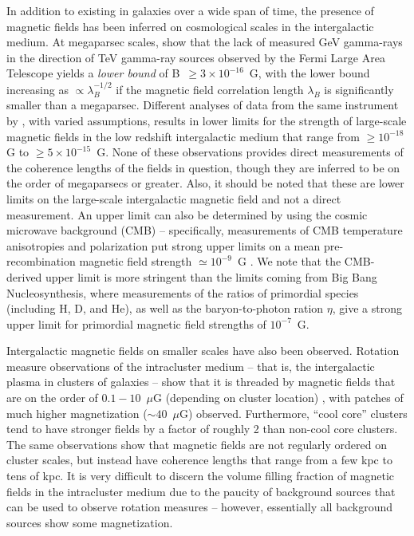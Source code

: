
In addition to existing in galaxies over a wide span of time, the
presence of magnetic fields has been inferred on cosmological scales
in the intergalactic medium.  At megaparsec scales,
\cite{2010Sci...328...73N} show that the lack of measured GeV
gamma-rays in the direction of TeV gamma-ray sources observed by the
Fermi Large Area Telescope yields a \textit{lower bound} of B~$\geq 3
\times 10^{-16}$~G, with the lower bound increasing as $\propto
\lambda_B^{-1/2}$ if the magnetic field correlation length $\lambda_B$
is significantly smaller than a megaparsec.  Different analyses of
data from the same instrument by \cite{2011ApJ...733L..21D,
2010MNRAS.406L..70T}, with varied assumptions, results in lower limits
for the strength of large-scale magnetic fields in the low redshift
intergalactic medium that range from $\geq 10^{-18}$ G to $\geq 5
\times 10^{-15}$~G.  None of these observations provides direct
measurements of the coherence lengths of the fields in question,
though they are inferred to be on the order of megaparsecs or greater.
Also, it should be noted that these are lower limits on the large-scale intergalactic
magnetic field and not a direct measurement.  An upper limit can also be determined by using the
cosmic microwave background (CMB) -- specifically, measurements of CMB
temperature anisotropies and polarization put strong upper limits on a
mean pre-recombination magnetic field strength $\simeq 10^{-9}$~G
\cite{1997PhRvL..78.3610B,2012SSRv..166...37W,2013A&ARv..21...62D}.
We note that the CMB-derived
upper limit is more stringent than the limits
coming from Big Bang Nucleosynthesis, where measurements of the ratios
of primordial species (including H, D, and He), as well as the
baryon-to-photon ration $\eta$, give a strong upper limit for
primordial magnetic field strengths of $10^{-7}$~G.

Intergalactic magnetic fields on smaller scales have also been
observed.  Rotation measure observations of the intracluster medium
-- that is, the intergalactic plasma in clusters of galaxies -- show
that it is threaded by magnetic fields that are on the order of
$0.1-10$~$\mu$G (depending on cluster location)
\cite{Carilli02,2005mpge.conf..231E, 2005A&A...434...67V}, with
patches of much higher magnetization ($\sim 40$~$\mu$G) observed.
Furthermore, ``cool core'' clusters tend to have stronger fields by a
factor of roughly 2 than non-cool core clusters.  The same
observations show that magnetic fields are not regularly ordered on
cluster scales, but instead have coherence lengths that range from a
few kpc to tens of kpc. It is very difficult to discern the volume
filling fraction of magnetic fields in the intracluster medium due to
the paucity of background sources that can be used to observe rotation
measures -- however, essentially all background sources show some
magnetization.
